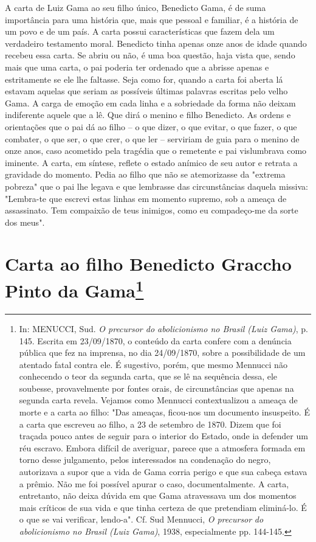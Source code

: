 {\small\noindent
A carta de Luiz Gama ao seu filho único, Benedicto Gama, é de suma
importância para uma história que, mais que pessoal e familiar, é a
história de um povo e de um país. A carta possui características que
fazem dela um verdadeiro testamento moral. Benedicto tinha apenas onze
anos de idade quando recebeu essa carta. Se abriu ou não, é uma boa
questão, haja vista que, sendo mais que uma carta, o pai poderia ter
ordenado que a abrisse apenas e estritamente se ele lhe faltasse. Seja
como for, quando a carta foi aberta lá estavam aquelas que seriam as
possíveis últimas palavras escritas pelo velho Gama. A carga de emoção
em cada linha e a sobriedade da forma não deixam indiferente aquele que
a lê. Que dirá o menino e filho Benedicto. As ordens e orientações que o
pai dá ao filho -- o que dizer, o que evitar, o que fazer, o que
combater, o que ser, o que crer, o que ler -- serviriam de guia para o
menino de onze anos, caso acometido pela tragédia que o remetente e pai
vislumbrava como iminente. A carta, em síntese, reflete o estado anímico
de seu autor e retrata a gravidade do momento. Pedia ao filho que não se
atemorizasse da "extrema pobreza" que o pai lhe legava e que lembrasse
das circunstâncias daquela missiva: "Lembra-te que escrevi estas linhas
em momento supremo, sob a ameaça de assassinato. Tem compaixão de teus
inimigos, como eu compadeço-me da sorte dos meus".}

\chapter{Carta ao filho Benedicto Graccho Pinto da Gama\footnote[*]{
  In: MENUCCI, Sud. \emph{O precursor do abolicionismo no Brasil (Luiz
  Gama)}, p. 145. Escrita em 23/09/1870, o conteúdo da carta confere com
  a denúncia pública que fez na imprensa, no dia 24/09/1870, sobre a
  possibilidade de um atentado fatal contra ele. É sugestivo, porém, que
  mesmo Mennucci não conhecendo o teor da segunda carta, que se lê na
  sequência dessa, ele soubesse, provavelmente por fontes orais, de
  circunstâncias que apenas na segunda carta revela. Vejamos como
  Mennucci contextualizou a ameaça de morte e a carta ao filho: "Das
  ameaças, ficou-nos um documento insuspeito. É a carta que escreveu ao
  filho, a 23 de setembro de 1870. Dizem que foi traçada pouco antes de
  seguir para o interior do Estado, onde ia defender um réu escravo.
  Embora difícil de averiguar, parece que a atmosfera formada em torno
  desse julgamento, pelos interessados na condenação do negro,
  autorizava a supor que a vida de Gama corria perigo e que sua cabeça
  estava a prêmio. Não me foi possível apurar o caso, documentalmente. A
  carta, entretanto, não deixa dúvida em que Gama atravessava um dos
  momentos mais críticos de sua vida e que tinha certeza de que
  pretendiam eliminá-lo. É o que se vai verificar, lendo-a". Cf. Sud
  Mennucci, \emph{O precursor} \emph{do abolicionismo no Brasil (Luiz
  Gama)}, 1938, especialmente pp. 144-145.}}

